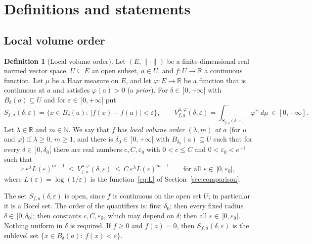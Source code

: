 \documentclass[11pt,a4paper]{article}
\theoremstyle{definition}
\newtheorem{definition}[theorem]{Definition}
\theoremstyle{remark}
\numberwithin{equation}{section}
\newcommand{\N}{\mathbb{N}}
\newcommand{\R}{\mathbb{R}}
\newcommand{\norm}[1]{\lVert #1\rVert}
\newcommand{\abs}[1]{\lvert #1\rvert}
\newcommand{\eps}{\varepsilon}
\begin{document}
\section{Definitions and statements}\label{sec:statements}

\subsection{Local volume order}

\begin{definition}[Local volume order]\label{def:order}
Let $(E,\norm\cdot)$ be a finite-dimensional real normed vector space, $U\subseteq E$ an open subset, $a\in U$, and $f:U\to\R$ a continuous function. Let $\mu$ be a Haar measure on $E$, and let $\varphi:E\to\R$ be a function that is continuous at $a$ and satisfies $\varphi(a)>0$ (a \emph{prior}). For $\delta\in\,]0,+\infty[$ with $B_\delta(a)\subseteq U$ and for $\eps\in\,]0,+\infty[$ put
\[
S_{f,a}(\delta,\eps)=\{x\in B_\delta(a):\ \abs{f(x)-f(a)}<\eps\},\qquad V^{\mu,\varphi}_{f,a}(\delta,\eps)=\int^-_{S_{f,a}(\delta,\eps)}\varphi^+\,d\mu\ \in[0,+\infty].
\]
Let $\lambda\in\R$ and $m\in\N$. We say that $f$ has \emph{local volume order $(\lambda,m)$ at $a$} (for $\mu$ and $\varphi$) if $\lambda\ge0$, $m\ge1$, and there is $\delta_0\in\,]0,+\infty[$ with $B_{\delta_0}(a)\subseteq U$ such that for every $\delta\in\,]0,\delta_0[$ there are real numbers $c,C,\eps_0$ with $0<c\le C$ and $0<\eps_0<e^{-1}$ such that
\begin{equation}\label{eq:order}
c\,\eps^\lambda L(\eps)^{m-1}\ \le\ V^{\mu,\varphi}_{f,a}(\delta,\eps)\ \le\ C\,\eps^\lambda L(\eps)^{m-1}\qquad\text{for all }\eps\in\,]0,\eps_0[,
\end{equation}
where $L(\eps)=\log(1/\eps)$ is the function~\eqref{eq:L} of Section~\ref{sec:comparison}.
\end{definition}

The set $S_{f,a}(\delta,\eps)$ is open, since $f$ is continuous on the open set $U$; in particular it is a Borel set. The order of the quantifiers is: first $\delta_0$; then every fixed radius $\delta\in\,]0,\delta_0[$; then constants $c,C,\eps_0$, which may depend on $\delta$; then all $\eps\in\,]0,\eps_0[$. Nothing uniform in $\delta$ is required. If $f\ge0$ and $f(a)=0$, then $S_{f,a}(\delta,\eps)$ is the sublevel set $\{x\in B_\delta(a):\ f(x)<\eps\}$.
\end{document}
